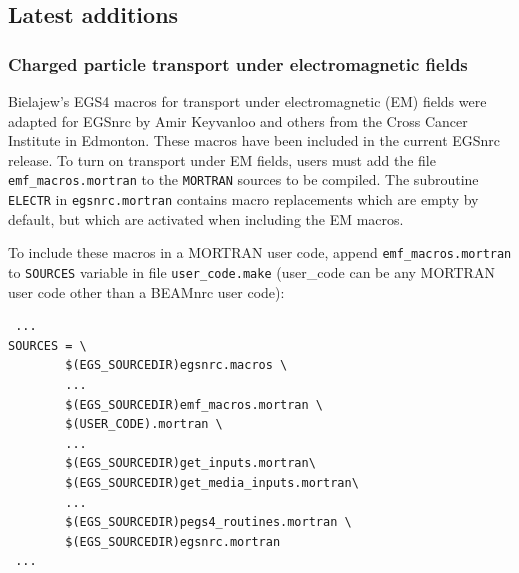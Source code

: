 %

\subsection{Latest additions}
\subsubsection{Charged particle transport under electromagnetic fields}
\label{EMF_macros_implementation}
Bielajew's EGS4 macros for transport under electromagnetic (EM) fields were adapted for EGSnrc by Amir Keyvanloo and
others from the Cross Cancer Institute in Edmonton. These macros have been included in the current EGSnrc release.
To turn on transport under EM fields, users must add the file {\tt emf\_macros.mortran} to the {\tt MORTRAN} sources to be compiled. The subroutine {\tt ELECTR} in {\tt egsnrc.mortran} contains macro replacements which are empty by default, but which are activated when including the EM macros.

To include these macros in a MORTRAN user code, append {\tt emf\_macros.mortran} to {\tt SOURCES} variable in file
{\tt user\_code.make} (user\_code can be any MORTRAN user code other than a BEAMnrc user code):
\begin{verbatim}
 ...
SOURCES = \
        $(EGS_SOURCEDIR)egsnrc.macros \
        ...
        $(EGS_SOURCEDIR)emf_macros.mortran \
        $(USER_CODE).mortran \
        ...
        $(EGS_SOURCEDIR)get_inputs.mortran\
        $(EGS_SOURCEDIR)get_media_inputs.mortran\
        ...
        $(EGS_SOURCEDIR)pegs4_routines.mortran \
        $(EGS_SOURCEDIR)egsnrc.mortran
 ...
\end{verbatim}

